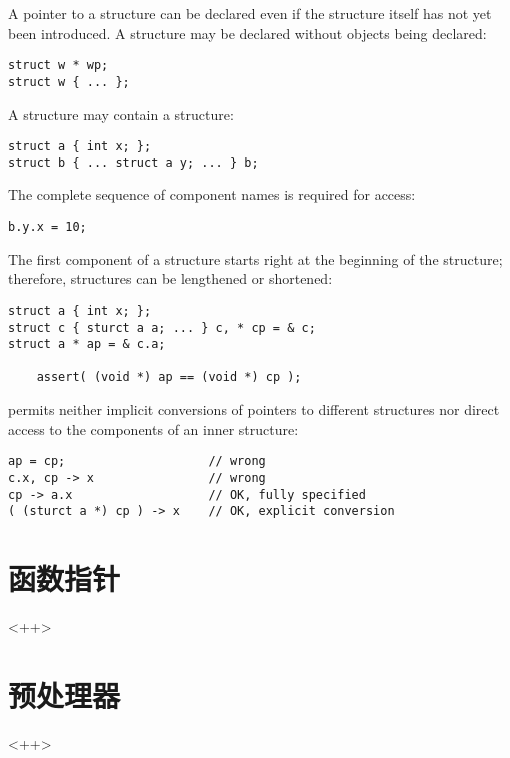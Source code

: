 A pointer to a structure can be declared even if the structure itself has
not yet been introduced. A structure may be declared without objects being
declared:
\begin{lstlisting}
struct w * wp;
struct w { ... };
\end{lstlisting}
A structure may contain a structure:
\begin{lstlisting}
struct a { int x; };
struct b { ... struct a y; ... } b;
\end{lstlisting}
The complete sequence of component names is required for access:
\begin{lstlisting}
b.y.x = 10;
\end{lstlisting}
The first component of a structure starts right at the beginning of the
structure; therefore, structures can be lengthened or shortened:
\begin{lstlisting}
struct a { int x; };
struct c { sturct a a; ... } c, * cp = & c;
struct a * ap = & c.a;

	assert( (void *) ap == (void *) cp );
\end{lstlisting}
 permits neither implicit conversions of pointers to different
structures nor direct access to the components of an inner structure:
\begin{lstlisting}
ap = cp;					// wrong
c.x, cp -> x				// wrong
cp -> a.x					// OK, fully specified
( (sturct a *) cp ) -> x	// OK, explicit conversion
\end{lstlisting}

\section{函数指针}
<++>

\section{预处理器}
<++>

